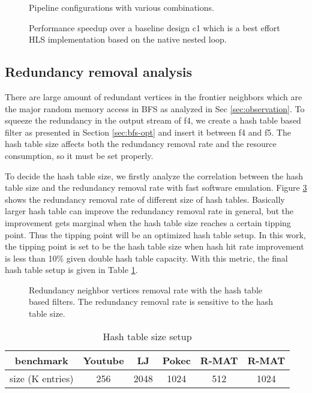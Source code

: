 \begin{figure}
    \caption{Pipeline configurations with various combinations.}
\label{fig:pipeline-config}
\end{figure}

\begin{figure}
    \caption{Performance speedup over a baseline design c1 which 
    is a best effort HLS implementation based on the native nested loop.}
\label{fig:pipeline-performance}
\end{figure}

\subsection{Redundancy removal analysis}
There are large amount of redundant vertices in the frontier neighbors which 
are the major random memory access in BFS as analyzed in Sec \ref{sec:observation}. 
To squeeze the redundancy in the output stream of f4, we create a hash table based 
filter as presented in Section \ref{sec:bfs-opt} and insert it between f4 and f5. 
The hash table size affects both the redundancy removal rate and the resource consumption,
so it must be set properly.

To decide the hash table size, we firstly analyze the correlation 
between the hash table size and the redundancy removal rate with 
fast software emulation. Figure \ref{fig:hash-redundancy} shows the 
redundancy removal rate of different size of hash tables.  Basically larger hash table 
can improve the redundancy removal rate in general, but the improvement gets marginal 
when the hash table size reaches a certain tipping point. Thus the tipping point will be 
an optimized hash table setup. In this work, the tipping point is set to be the hash table size 
when hash hit rate improvement is less than 10\% given double hash table capacity.   
With this metric, the final hash table setup is given in Table \ref{tab:hash-size}.

\begin{figure}
    \caption{Redundancy neighbor vertices removal rate with the hash table based filters. 
    The redundancy removal rate is sensitive to the hash table size.}
\label{fig:hash-redundancy}
\end{figure}

\begin{table}
    \centering
  \caption{Hash table size setup}
  \label{tab:hash-size}
  \begin{tabular}{cccccc}
    \toprule
      benchmark & Youtube & LJ & Pokec & R-MAT\uppercase\expandafter{\romannumeral1} 
      & R-MAT\uppercase\expandafter{\romannumeral2} \\
    \midrule
      size (K entries) & 256 & 2048 & 1024 & 512 & 1024 \\
  \bottomrule
\end{tabular}
\end{table}


